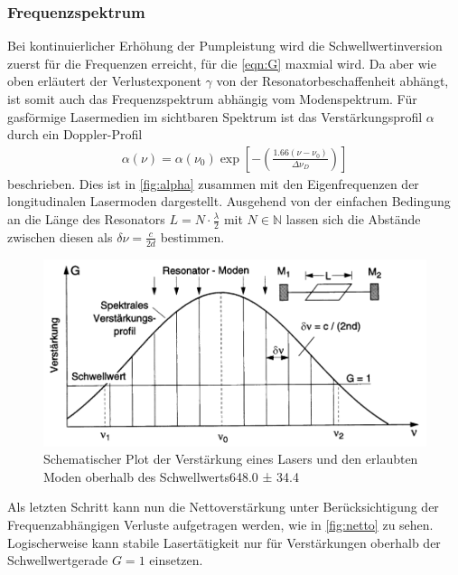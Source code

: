 \subsubsection{Frequenzspektrum}\label{subsubsec:frequenzen}
Bei kontinuierlicher Erhöhung der Pumpleistung wird die Schwellwertinversion zuerst für die Frequenzen erreicht, für die \autoref{eqn:G} maxmial wird.
Da aber wie oben erläutert der Verlustexponent $\gamma$ von der Resonatorbeschaffenheit abhängt, ist somit auch das Frequenzspektrum abhängig vom Modenspektrum.
Für gasförmige Lasermedien im sichtbaren Spektrum ist das Verstärkungsprofil $\alpha$ durch ein Doppler-Profil 
\begin{align}
    \alpha(\nu)=\alpha(\nu_0)\exp{\left[-\left(\frac{1.66(\nu-\nu_0)}{\Delta\nu_D}\right)\right]}
\end{align}
beschrieben. Dies ist in \autoref{fig:alpha} zusammen mit den Eigenfrequenzen der longitudinalen Lasermoden dargestellt. Ausgehend von der einfachen Bedingung an die Länge des Resonators $L = N\cdot\frac{\lambda}{2}$ mit $N\in\mathbb{N}$ lassen sich die Abstände zwischen diesen als $\delta\nu=\frac{c}{2d}$ bestimmen.
\begin{figure}[H]
    \centering
    \includegraphics[scale=0.5]{Ressourcen/alpha.png}
    \caption{Schematischer Plot der Verstärkung eines Lasers und den erlaubten Moden oberhalb des Schwellwerts648.0 ± 34.4}\label{fig:alpha}
\end{figure}
Als letzten Schritt kann nun die Nettoverstärkung unter Berücksichtigung der Frequenzabhängigen Verluste aufgetragen werden, wie in \autoref{fig:netto} zu sehen. Logischerweise kann stabile Lasertätigkeit nur für Verstärkungen oberhalb der Schwellwertgerade $G=1$ einsetzen.
